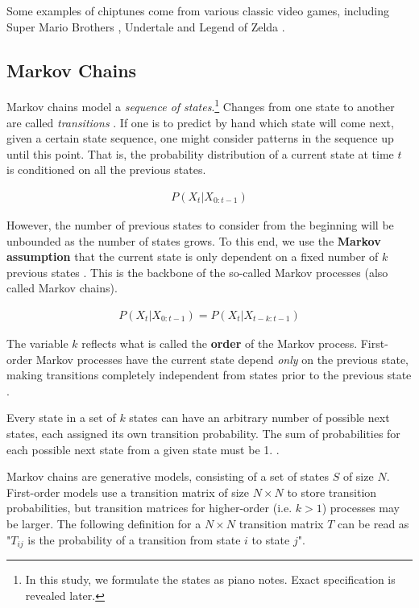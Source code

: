 \documentclass{article}
\begin{document}
Some examples of chiptunes come from various classic video games, including Super Mario Brothers \cite{kondo_2009}, Undertale \cite{fox_2017} and 
Legend of Zelda \cite{nakatsuka_2009}.

\subsection{Markov Chains}
Markov chains model a \emph{sequence of states}.\footnote{In this study, we formulate the states as piano notes. Exact specification is revealed later.} Changes from 
one state to another are called \emph{transitions} \cite{markov_survey}. If one is to predict by hand which state will come next, given a certain state sequence, one might 
consider patterns in the sequence up until this point. That is, the probability distribution of a current state at time $t$ is conditioned on all the previous states.

\begin{align*}
  P(X_t | X_{0:t-1})
\end{align*}

However, the number of previous states to consider from the beginning will be unbounded as the number of states grows. To this end, we use the \textbf{Markov assumption} that 
the current state is only dependent on a fixed number of $k$ previous states \cite{russell_norvig_2022}. This is the backbone of the so-called Markov processes (also called 
Markov chains). 

\begin{align*}
  P(X_t | X_{0:t-1}) = P(X_t | X_{t-k:t-1})
\end{align*}

The variable $k$ reflects what is called the \textbf{order} of the Markov process. First-order Markov processes have the current state depend \emph{only} on the previous 
state, making transitions completely independent from states prior to the previous state \cite{russell_norvig_2022}.

Every state in a set of $k$ states can have an arbitrary number of possible next states, each assigned its own transition probability. The sum of probabilities for each 
possible next state from a given state must be 1. \cite{markov_construct}. 

Markov chains are generative models, consisting of a set of states $S$ of size $N$. First-order models use a transition matrix of size $N\times N$ to store transition 
probabilities, but transition matrices for higher-order (i.e. $k>1$) processes may be larger. The following definition for a $N\times N$ transition matrix $T$ can be read as 
"$T_{ij}$ is the probability of a transition from state $i$ to state $j$". 
\end{document}
